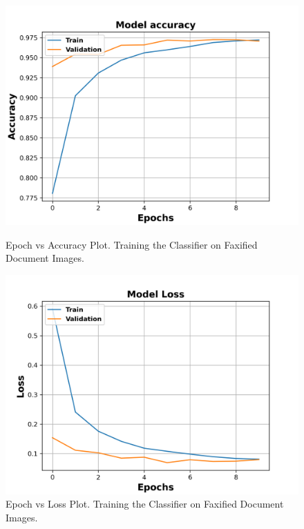 \begin{figure}[H]
  \centering
  \begin{minipage}[b]{0.49\textwidth}
    \includegraphics[width=\textwidth]{images/Faxifier_Data_Classifier_2021-05-21_13-50-07_Accuracy.png}
    \caption[Epoch vs Accuracy Plot. Training the Classifier on Faxified Document Images.]{Epoch vs Accuracy Plot. Training the Classifier on Faxified Document Images.}
    \label{fig:FaxifiedClassifierAcc}
  \end{minipage}
  \hfill
  \begin{minipage}[b]{0.49\textwidth}
    \includegraphics[width=\textwidth]{images/Faxifier_Data_Classifier_2021-05-21_13-50-07_Loss.png}
    \caption[Epoch vs Loss Plot. Training the Classifier on Faxified Document Images.]{Epoch vs Loss Plot. Training the Classifier on Faxified Document Images.}
    \label{fig:FaxifiedClassifierLoss}
  \end{minipage}
\end{figure}




